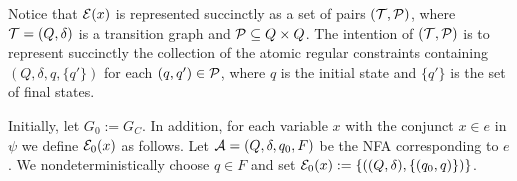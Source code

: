 Notice that $\mathcal{E}(x)$ is represented succinctly as a set of pairs $(\mathcal{T}, \mathcal{P})$, where $\mathcal{T}=(Q, \delta)$ is a transition graph and $\mathcal{P} \subseteq Q \times Q$. The intention of $(\mathcal{T}, \mathcal{P})$ is to represent succinctly the collection of the atomic regular constraints containing $(Q, \delta, q, \{q'\})$ for each $(q,q') \in \mathcal{P}$, where $q$ is the initial state and $\{q'\}$ is the set of final states.


Initially, let $G_0:= G_C$.  In addition, for each variable $x$ with the conjunct $x \in e$ in $\psi$ we define $\mathcal{E}_0(x)$ as follows.  Let $\mathcal{A}=(Q, \delta, q_0, F)$ be the NFA corresponding to $e$. We nondeterministically choose $q \in F$ and set $\mathcal{E}_0(x):=  \{((Q, \delta), \{(q_0, q)\})\}$.


%

